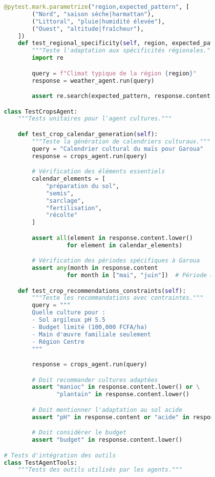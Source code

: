 \begin{figure}[h]
\begin{lstlisting}[language=Python, caption=Framework de tests unitaires pour agents ADK]
    @pytest.mark.parametrize("region,expected_pattern", [
        ("Nord", "saison sèche|harmattan"),
        ("Littoral", "pluie|humidité élevée"),
        ("Ouest", "altitude|fraîcheur"),
    ])
    def test_regional_specificity(self, region, expected_pattern):
        """Teste l'adaptation aux spécificités régionales."""
        import re

        query = f"Climat typique de la région {region}"
        response = weather_agent.run(query)

        assert re.search(expected_pattern, response.content, re.IGNORECASE)

class TestCropsAgent:
    """Tests unitaires pour l'agent cultures."""

    def test_crop_calendar_generation(self):
        """Teste la génération de calendriers culturaux."""
        query = "Calendrier cultural du maïs pour Garoua"
        response = crops_agent.run(query)

        # Vérification des éléments essentiels
        calendar_elements = [
            "préparation du sol",
            "semis",
            "sarclage",
            "fertilisation",
            "récolte"
        ]

        assert all(element in response.content.lower()
                  for element in calendar_elements)

        # Vérification des périodes spécifiques à Garoua
        assert any(month in response.content
                  for month in ["mai", "juin"])  # Période de semis

    def test_crop_recommendations_constraints(self):
        """Teste les recommandations avec contraintes."""
        query = """
        Quelle culture pour :
        - Sol argileux pH 5.5
        - Budget limité (100,000 FCFA/ha)
        - Main d'œuvre familiale seulement
        - Région Centre
        """

        response = crops_agent.run(query)

        # Doit recommander cultures adaptées
        assert "manioc" in response.content.lower() or \
               "plantain" in response.content.lower()

        # Doit mentionner l'adaptation au sol acide
        assert "pH" in response.content or "acide" in response.content

        # Doit considérer le budget
        assert "budget" in response.content.lower()

# Tests d'intégration des outils
class TestAgentTools:
    """Tests des outils utilisés par les agents."""


\end{lstlisting}
\end{figure}
